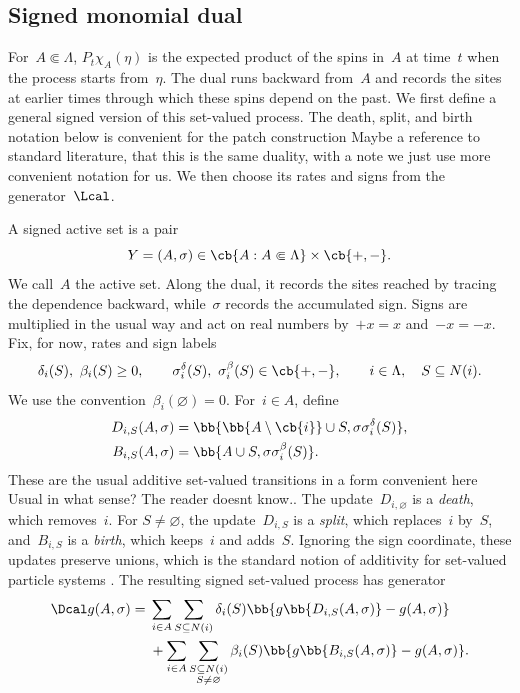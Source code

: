 
\subsection{Signed monomial dual}
\label{subsec:signed-set-process}

For~$A\Subset\Lambda$, $P_t\chi_A(\eta)$ is the expected product of the spins
in~$A$ at time~$t$ when the process starts from~$\eta$. The dual runs backward
from~$A$ and records the sites at earlier times through which these spins depend
on the past. We first define a general signed version of this set-valued process.
The death, split, and birth notation below is convenient for the patch construction {\color{red} Maybe a reference to standard literature, that this is the same duality, with a note we just use more convenient notation for us}.
We then choose its rates and signs from the generator~$\Lcal$.

A signed active set is a pair
\begin{equation*}
Y=(A,\sigma)
\in
\cb{A:A\Subset\Lambda}\times\cb{+,-}.
\end{equation*}
We call~$A$ the active set. Along the dual, it records the sites reached by
tracing the dependence backward, while~$\sigma$ records the accumulated sign.
Signs are multiplied in the usual way and act on real
numbers by~$+x=x$ and~$-x=-x$. Fix, for now, rates and sign labels
\begin{equation*}
\delta_i(S),\ \beta_i(S)\geq0,
\qquad
\sigma_i^\delta(S),\ \sigma_i^\beta(S)\in\cb{+,-},
\qquad
i\in\Lambda,\quad S\subseteq N(i).
\end{equation*}
We use the convention~$\beta_i(\varnothing)=0$. For~$i\in A$, define
\begin{align*}
D_{i,S}(A,\sigma)
&=
\bb{\bb{A\setminus\cb{i}}\cup S,
\sigma\sigma_i^\delta(S)},
\\
B_{i,S}(A,\sigma)
&=
\bb{A\cup S,
\sigma\sigma_i^\beta(S)}.
\end{align*}
These are the usual additive set-valued transitions in a form convenient here {\color{red} Usual in what sense? The reader doesnt know.}.
The update~$D_{i,\varnothing}$ is a \emph{death}, which removes~$i$. For
$S\neq\varnothing$, the update~$D_{i,S}$ is a \emph{split}, which replaces~$i$
by~$S$, and~$B_{i,S}$ is a \emph{birth}, which keeps~$i$ and adds~$S$.
Ignoring the sign coordinate, these updates preserve unions, which is the
standard notion of additivity for set-valued particle systems
\cite{Harris1978,Griffeath1979,Gray1986}. The resulting signed set-valued
process has generator
\begin{align*}
\Dcal g(A,\sigma)
={}&
\sum_{i\in A}\sum_{S\subseteq N(i)}
\delta_i(S)
\bb{g\bb{D_{i,S}(A,\sigma)}-g(A,\sigma)}
\\
&+
\sum_{i\in A}
\sum_{\substack{S\subseteq N(i)\\S\neq\varnothing}}
\beta_i(S)
\bb{g\bb{B_{i,S}(A,\sigma)}-g(A,\sigma)}.
\end{align*}

